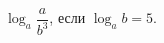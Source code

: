 \begin{ex}
	\begin{condition}
		\( \log_a\dfrac{a}{b^3} \), если \( \log_a b = 5 \).
	\end{condition}
\end{ex}
